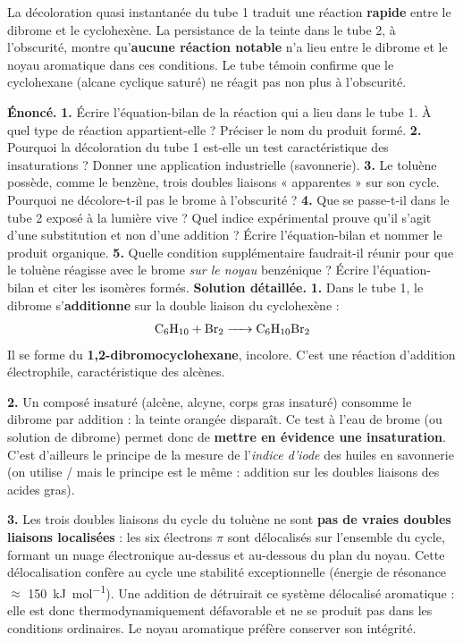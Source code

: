 \documentclass[11pt]{article}
\newcommand{\cle}[1]{{\popxbold\color{popdark}#1}}
\newcounter{popsec}
\newcounter{popsub}
\newcommand{\courssub}[1]{%
  \stepcounter{popsub}%
  \par\vspace{9pt}\noindent{\popxbold\fontsize{11.5}{13}\selectfont\color{popink}{\color{poporange}\thepopsec.\thepopsub}\hspace{6pt}#1}\par\nopagebreak\vspace{4pt}
}
\begin{document}
La décoloration quasi instantanée du tube 1 traduit une réaction \textbf{rapide} entre le dibrome et le cyclohexène. La persistance de la teinte dans le tube 2, à l'obscurité, montre qu'\textbf{aucune réaction notable} n'a lieu entre le dibrome et le noyau aromatique dans ces conditions. Le tube témoin confirme que le cyclohexane (alcane cyclique saturé) ne réagit pas non plus à l'obscurité.

\courssub{Exploitation}

\begin{exoresolu}
\textbf{Énoncé.}
\textbf{1.} Écrire l'équation-bilan de la réaction qui a lieu dans le tube 1. À quel type de réaction appartient-elle ? Préciser le nom du produit formé.
\textbf{2.} Pourquoi la décoloration du tube 1 est-elle un test caractéristique des insaturations ? Donner une application industrielle (savonnerie).
\textbf{3.} Le toluène possède, comme le benzène, trois doubles liaisons « apparentes » sur son cycle. Pourquoi ne décolore-t-il pas le brome à l'obscurité ?
\textbf{4.} Que se passe-t-il dans le tube 2 exposé à la lumière vive ? Quel indice expérimental prouve qu'il s'agit d'une substitution et non d'une addition ? Écrire l'équation-bilan et nommer le produit organique.
\textbf{5.} Quelle condition supplémentaire faudrait-il réunir pour que le toluène réagisse avec le brome \emph{sur le noyau} benzénique ? Écrire l'équation-bilan et citer les isomères formés.
\tcblower
\textbf{Solution détaillée.}
\textbf{1.} Dans le tube 1, le dibrome s'\textbf{additionne} sur la double liaison  du cyclohexène :
\[ \ce{C6H10 + Br2 -> C6H10Br2} \]
Il se forme du \textbf{1,2-dibromocyclohexane}, incolore. C'est une \cle{réaction d'addition} électrophile, caractéristique des alcènes.

\textbf{2.} Un composé insaturé (alcène, alcyne, corps gras insaturé) consomme le dibrome par addition : la teinte orangée disparaît. Ce test à l'eau de brome (ou solution de dibrome) permet donc de \textbf{mettre en évidence une insaturation}. C'est d'ailleurs le principe de la mesure de l'\emph{indice d'iode} des huiles en savonnerie (on utilise  /  mais le principe est le même : addition sur les doubles liaisons des acides gras).

\textbf{3.} Les trois doubles liaisons du cycle du toluène ne sont \textbf{pas de vraies doubles liaisons localisées} : les six électrons $\pi$ sont \cle{délocalisés} sur l'ensemble du cycle, formant un nuage électronique au-dessus et au-dessous du plan du noyau. Cette délocalisation confère au cycle une stabilité exceptionnelle (énergie de résonance $\approx$ \SI{150}{kJ.mol^{-1}}). Une addition de  détruirait ce système délocalisé aromatique : elle est donc thermodynamiquement défavorable et ne se produit pas dans les conditions ordinaires. Le noyau aromatique préfère conserver son intégrité.


\end{exoresolu}
\end{document}
